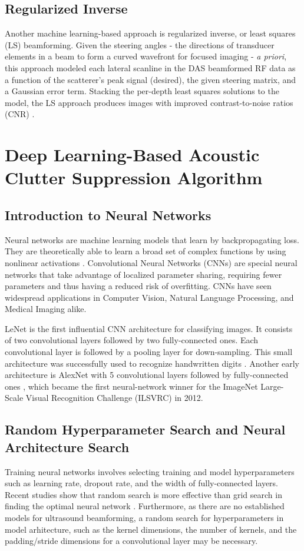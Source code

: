     \subsection{Regularized Inverse}
      Another machine learning-based approach is regularized inverse, or least squares (LS) beamforming. Given the steering angles - the directions of transducer elements in a beam to form a curved wavefront for focused imaging - \textit{a priori}, this approach modeled each lateral scanline in the DAS beamformed RF data as a function of the scatterer's peak signal (desired), the given steering matrix, and a Gaussian error term. Stacking the per-depth least squares solutions to the model, the LS approach produces images with improved contrast-to-noise ratios (CNR) \cite{szasz_regularized_inverse}. %

  \section{Deep Learning-Based Acoustic Clutter Suppression Algorithm} %
    \subsection{Introduction to Neural Networks}
      Neural networks are machine learning models that learn by backpropagating loss. They are theoretically able to learn a broad set of complex functions by using nonlinear activations \cite{rumelhart1985learning}. Convolutional Neural Networks (CNNs) are special neural networks that take advantage of localized parameter sharing, requiring fewer parameters and thus having a reduced risk of overfitting. CNNs have seen widespread applications in Computer Vision, Natural Language Processing, and Medical Imaging alike.

      LeNet is the first influential CNN architecture for classifying images. It consists of two convolutional layers followed by two fully-connected ones. Each convolutional layer is followed by a pooling layer for down-sampling. This small architecture was successfully used to recognize handwritten digits \cite{lenet}. Another early architecture is AlexNet with 5 convolutional layers followed by fully-connected ones \cite{krizhevsky2012imagenet}, which became the first neural-network winner for the ImageNet Large-Scale Visual Recognition Challenge (ILSVRC) in 2012.

    \subsection{Random Hyperparameter Search and Neural Architecture Search}
      Training neural networks involves selecting training and model hyperparameters such as learning rate, dropout rate, and the width of fully-connected layers. Recent studies show that random search is more effective than grid search in finding the optimal neural network \cite{bergstra2012random}. Furthermore, as there are no established models for ultrasound beamforming, a random search for hyperparameters in model arhitecture, such as the kernel dimensions, the number of kernels, and the padding/stride dimensions for a convolutional layer may be necessary.

